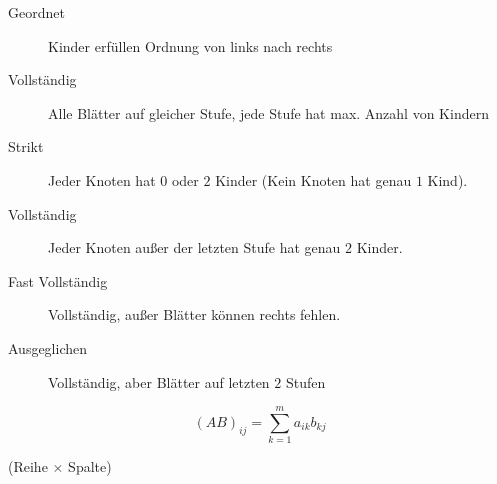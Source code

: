 \documentclass[uniLeipzig]{merkzettel}
\begin{document}
\begin{mzImportant}
  \begin{description}
    \item[Geordnet] Kinder erfüllen Ordnung von links nach rechts

    \item[Vollständig]
      Alle Blätter auf gleicher Stufe, jede Stufe hat max. Anzahl von Kindern
  \end{description}
\end{mzImportant}

\begin{mzImportant}
  \begin{description}
    \item[Strikt]
      Jeder Knoten hat $0$ oder $2$ Kinder (Kein Knoten hat genau $1$ Kind).

    \item[Vollständig]
      Jeder Knoten au\ss er der letzten Stufe hat genau $2$ Kinder.

    \item[Fast Vollständig]
      Vollständig, au\ss er Blätter können rechts fehlen.

    \item[Ausgeglichen]
      Vollständig, aber Blätter auf letzten $2$ Stufen
  \end{description}
\end{mzImportant}

\begin{mzImportant}
  $$(AB)_{ij} = \sum_{k=1}^m a_{ik}b_{kj}$$

  (Reihe $\times$ Spalte)
\end{mzImportant}
\end{document}
